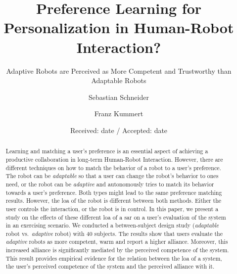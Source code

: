 \documentclass[twocolumn]{svjour3}          %
\begin{document}




\title{Preference Learning for Personalization in Human-Robot Interaction?}
\subtitle{Adaptive Robots are Perceived as More Competent and Trustworthy than Adaptable Robots}



\author{ Sebastian Schneider \and Franz Kummert }


\institute{
    }

\date{Received: date / Accepted: date}


\maketitle


\begin{abstract}

Learning and matching a user's preference is an essential aspect of
achieving a productive collaboration in long-term Human-Robot
Interaction. However, there are different techniques on how to match the
behavior of a robot to a user's preference. The robot can be \textit{adaptable}
so that a user can change the robot's behavior to ones need, or the
robot can be \textit{adaptive} and autonomously tries to match its behavior
towards a user's preference. Both types might lead to the same
preference matching results. However, the \gls{loa} of
the robot is different between both methods. Either the user controls
the interaction, or the robot is in control. In this paper, we present a
study on the effects of these different \gls{loa} of a \gls{sar} on a user's evaluation of the system in an exercising
scenario. We conducted a between-subject design study (\textit{adaptable} robot
vs.~\textit{adaptive} robot) with 40 subjects. The results show that users
evaluate the \textit{adaptive} robots as more competent, warm and report a higher
alliance. Moreover, this increased alliance is significantly mediated by
the perceived competence of the system. This result provides empirical
evidence for the relation between the \gls{loa} of a system, the user's
perceived competence of the system and the perceived alliance with it.
\\
\keywords{
    }


\end{abstract}
\end{document}
